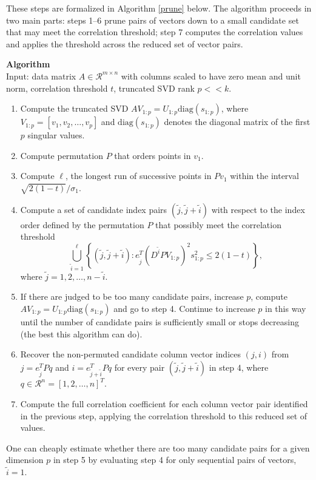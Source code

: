 \documentclass{article}
\newcounter{algorithmctr}
\newenvironment{algorithm}{
   \refstepcounter{algorithmctr}
   \bigskip\noindent
   \textbf{Algorithm \thealgorithmctr\\}
}
{\bigskip}
\numberwithin{algorithmctr}{section}
\begin{document}
These steps are formalized in Algorithm \ref{prune} below. The algorithm
proceeds in two main parts: steps 1--6 prune pairs of vectors down to a small
candidate set that may meet the correlation threshold; step 7
computes the correlation values and applies the threshold across the reduced
set of vector pairs.

\begin{algorithm}\label{prune}
Input: data matrix $A\in \mathcal{R}^{m\times n}$ with columns scaled to have
zero mean and unit norm, correlation threshold $t$,
truncated SVD rank $p<<k$.
\begin{enumerate}
\item Compute the truncated SVD
$AV_{1:p} = U_{1:p}\mathrm{diag}(s_{1:p})$,
where\\
$V_{1:p}=[v_1, v_2, \ldots, v_p]$
and $\mathrm{diag}(s_{1:p})$ denotes the diagonal matrix of the first $p$ singular values.
\item Compute permutation $P$ that orders points in $v_1$.
\item Compute $\ell$, the longest run of successive points in $P v_1$ within the interval $\sqrt{2(1-t)}/\sigma_1$.
\item Compute a set of candidate index pairs $(\tilde{j},\tilde{j}+\tilde{i})$ with respect to the index order defined by the permutation $P$ that possibly meet the correlation threshold
\[
\bigcup_{\tilde{i}=1}^\ell
\left\{
(\tilde{j},\tilde{j}+\tilde{i}) : 
e_{\tilde{j}}^T(D^{\tilde{i}} P V_{1:p} )^2 s_{1:p}^2 \le 2(1-t)
\right\},
\]
where $\tilde{j}=1,2,\ldots,n-\tilde{i}$.
\item If there are judged to be  too many candidate pairs, increase $p$,
compute $AV_{1:p} = U_{1:p}\mathrm{diag}(s_{1:p})$ and go to step 4.
Continue to increase $p$ in this way until the number of candidate
pairs is sufficiently small or stops decreasing (the best this algorithm can do).
\item Recover the non-permuted candidate column vector
indices $(j,i)$ from $j=e_{\tilde{j}}^T Pq$ and $i=e_{\tilde{j}+\tilde{i}}^TPq$ for every
pair $(\tilde{j},\tilde{j} + \tilde{i})$ in step 4, where
$q\in\mathcal{R}^n = [1,2,\ldots,n]^T$.
\item Compute the full correlation coefficient for each column vector pair identified in
the previous step, applying the correlation threshold to this reduced set of values.
\end{enumerate}
\end{algorithm}
One can cheaply estimate whether there are too many candidate pairs for a
given dimension $p$ in step 5 by evaluating step 4 for only sequential pairs of
vectors, $\tilde{i}=1$.
\end{document}
